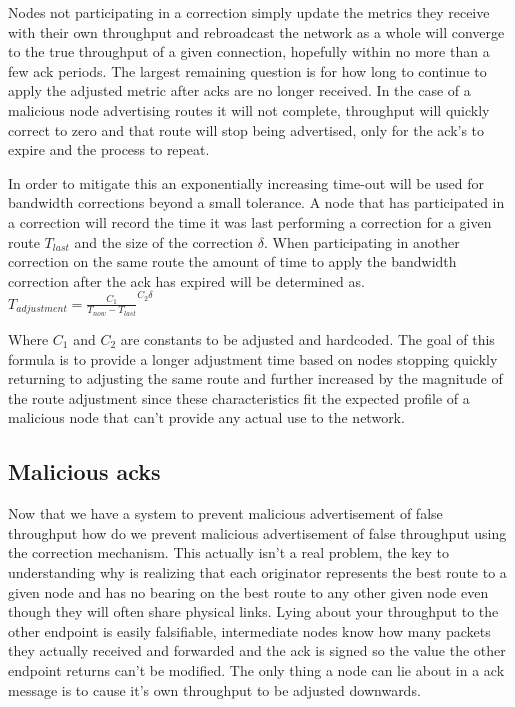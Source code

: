 \documentclass[11pt]{article}
\begin{document}
				Nodes not participating in a correction simply update the metrics they receive with their own throughput and rebroadcast the network as a whole will converge to the true throughput of a given connection, hopefully within no more than a few ack periods. The largest remaining question is for how long to continue to apply the adjusted metric after acks are no longer received. In the case of a malicious node advertising routes it will not complete, throughput will quickly correct to zero and that route will stop being advertised, only for the ack's to expire and the process to repeat. 
				
				In order to mitigate this an exponentially increasing time-out will be used for bandwidth corrections beyond a small tolerance. A node that has participated in a correction will record the time it was last performing a correction for a given route $T_{last}$ and the size of the correction $\delta$. When participating in another correction on the same route the amount of time to apply the bandwidth correction after the ack has expired will be determined as. 
				\newline
				$T_{adjustment} = \frac{C_1}{T_{now} - T_{last}}^{C_2\delta}$
				\newline
				
				Where $C_1$ and  $C_2$ are constants to be adjusted and hardcoded. The goal of this formula is to provide a longer adjustment time based on nodes stopping quickly returning to adjusting the same route and further increased by the magnitude of the route adjustment since these characteristics fit the expected profile of a malicious node that can't provide any actual use to the network.
				
	\subsection{Malicious acks}
	
				Now that we have a system to prevent malicious advertisement of false throughput how do we prevent malicious advertisement of false throughput using the correction mechanism. This actually isn't a real problem, the key to understanding why is realizing that each originator represents the best route to a given node and has no bearing on the best route to any other given node even though they will often share physical links. Lying about your throughput to the other endpoint is easily falsifiable, intermediate nodes know how many packets they actually received and forwarded and the ack is signed so the value the other endpoint returns can't be modified. The only thing a node can lie about in a ack message is to cause it's own throughput to be adjusted downwards. 
\end{document}
